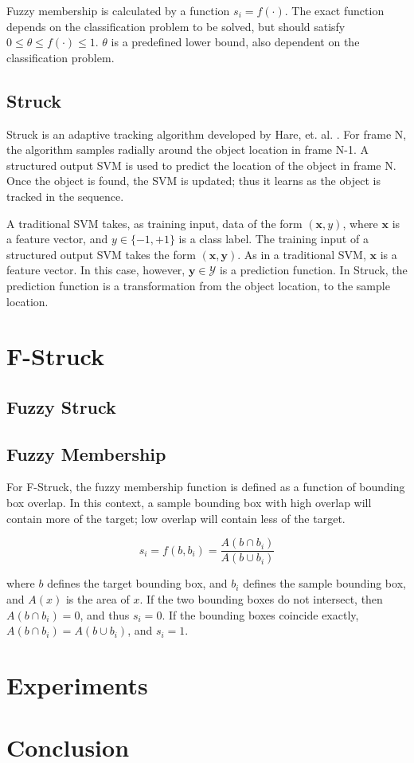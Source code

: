 \documentclass{IEEEtran}
\begin{document}
Fuzzy membership is calculated by a function \(s_i = f(\cdot)\). The exact function depends on the
classification problem to be solved, but should satisfy \(0 \le \theta \le f(\cdot) \le 1\).
\(\theta\) is a predefined lower bound, also dependent on the classification problem.

\subsection{Struck} %
Struck is an adaptive tracking algorithm developed by Hare, et. al. \cite{6126251}. For frame N, the
algorithm samples radially around the object location in frame N-1. A structured output SVM is used
to predict the location of the object in frame N. Once the object is found, the SVM is updated; thus
it learns as the object is tracked in the sequence.

A traditional SVM takes, as training input, data of the form \((\textbf{x}, y)\), where
\(\textbf{x}\) is a feature vector, and \(y \in \{-1, +1\}\) is a class label. The training input of
a structured output SVM takes the form \((\textbf{x}, \textbf{y})\). As in a traditional SVM,
\(\textbf{x}\) is a feature vector. In this case, however, \(\textbf{y} \in \mathcal{Y}\) is a prediction
function. In Struck, the prediction function is a transformation from the object location, to the
sample location.

\section{F-Struck}

\subsection{Fuzzy Struck}

\subsection{Fuzzy Membership}
For F-Struck, the fuzzy membership function is defined as a function of bounding box overlap. In
this context, a sample bounding box with high overlap will contain more of the target; low overlap
will contain less of the target.

\begin{displaymath}
    s_i = f\left(b, b_i\right) = \frac{A(b \cap b_i)}{A(b \cup b_i)}
\end{displaymath}

where \(b\) defines the target bounding box, and \(b_i\) defines the sample bounding box, and
\(A(x)\) is the area of \(x\). If the two bounding boxes do not intersect, then \(A\left(b \cap
b_i\right) = 0\), and thus \(s_i = 0\). If the bounding boxes coincide exactly,
\(A\left(b \cap b_i\right) = A\left(b \cup b_i\right)\), and \(s_i = 1\).

\section{Experiments}

\section{Conclusion}



\end{document}
